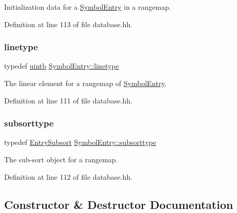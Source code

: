 Initialization data for a \mbox{\hyperlink{class_symbol_entry}{Symbol\+Entry}} in a rangemap. 



Definition at line 113 of file database.\+hh.

\mbox{\label{class_symbol_entry_a314b03465bd3849ffe266057d69a7e37}} 
\subsubsection{\texorpdfstring{linetype}{linetype}}
{\footnotesize\ttfamily typedef \mbox{\hyperlink{types_8h_a2db313c5d32a12b01d26ac9b3bca178f}{uintb}} \mbox{\hyperlink{class_symbol_entry_a314b03465bd3849ffe266057d69a7e37}{Symbol\+Entry\+::linetype}}}



The linear element for a rangemap of \mbox{\hyperlink{class_symbol_entry}{Symbol\+Entry}}. 



Definition at line 111 of file database.\+hh.

\mbox{\label{class_symbol_entry_a3163188293595446b1f1dafccab7df15}} 
\subsubsection{\texorpdfstring{subsorttype}{subsorttype}}
{\footnotesize\ttfamily typedef \mbox{\hyperlink{class_symbol_entry_1_1_entry_subsort}{Entry\+Subsort}} \mbox{\hyperlink{class_symbol_entry_a3163188293595446b1f1dafccab7df15}{Symbol\+Entry\+::subsorttype}}}



The sub-\/sort object for a rangemap. 



Definition at line 112 of file database.\+hh.



\subsection{Constructor \& Destructor Documentation}
\mbox{\label{class_symbol_entry_a50c0100d619041b6e485e7ec533fc2b8}} 
